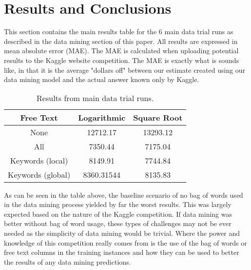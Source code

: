 \section{Results and Conclusions}

This section contains the main results table for the 6 main data trial runs as described in the data mining section
of this paper. All results are expressed in mean absolute error (MAE). The MAE is calculated when uploading potential
results to the Kaggle website competition. The MAE is exactly what is sounds like, in that it is the average
"dollars off" between our estimate created using our data mining model and the actual answer known only by Kaggle.\\

\begin{table}[h!]
\begin{center}
\begin{tabular}{c c c}
\hline
Free Text & Logarithmic & Square Root\\
\hline
\hline
None & 12712.17 & 13293.12\\
All & 7350.44 & 7175.04\\
Keywords (local) & 8149.91 & 7744.84\\
Keywords (global) & 8360.31544 & 8135.83 \\
\hline
\end{tabular}
\end{center}
\caption{Results from main data trial runs.\label{tab:results}}
\end{table}

As can be seen in the table above, the baseline scenario of no bag of words used in the data mining process yielded
by far the worst results. This was largely expected based on the nature of the Kaggle competition. If data mining
was better without bag of word usage, these types of challenges may not be ever needed as the simplicity of data
mining would be trivial. Where the power and knowledge of this competition really comes from is the use of the
bag of words or free text columns in the training instances and how they can be used to better the results of any
data mining predictions.\\

